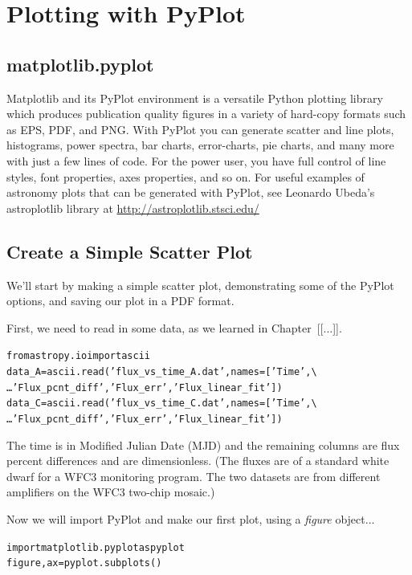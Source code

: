 \chapter{Plotting with PyPlot}
\label{ch:pyplot}

\section{matplotlib.pyplot}
Matplotlib and its PyPlot environment is a versatile Python plotting
library which produces publication quality figures in a variety of
hard-copy formats such as EPS, PDF, and PNG.  With PyPlot you can
generate scatter and line plots, histograms, power spectra, bar
charts, error-charts, pie charts, and many more with just a few lines
of code. For the power user, you have full control of line styles,
font properties, axes properties, and so on. For useful examples of 
astronomy plots that can be generated with PyPlot, see Leonardo 
Ubeda's astroplotlib library at \href{http://astroplotlib.stsci.edu/}
{http://astroplotlib.stsci.edu/}


\section{Create a Simple Scatter Plot}

We'll start by making a simple scatter plot, demonstrating some of 
the PyPlot options, and saving our plot in a PDF format. 

First, we need to read in some data, as we learned in Chapter~[[...]].

\begin{alltt}
\pytab from astropy.io import ascii
\pytab data_A = ascii.read('flux_vs_time_A.dat', names=['Time',  \textbackslash 
\ldots 'Flux_pcnt_diff', 'Flux_err', 'Flux_linear_fit'])
\pytab data_C = ascii.read('flux_vs_time_C.dat', names=['Time',  \textbackslash 
\ldots 'Flux_pcnt_diff', 'Flux_err', 'Flux_linear_fit'])
\end{alltt}

The time is in Modified Julian Date (MJD) and the remaining 
columns are flux percent differences and are dimensionless. 
(The fluxes are of a standard white dwarf for a WFC3 monitoring 
program. The two datasets are from different amplifiers
on the WFC3 two-chip mosaic.)

Now we will import PyPlot and make our first plot, 
using a \textit{figure} object...

\begin{alltt}
\pytab import matplotlib.pyplot as pyplot
\pytab figure, ax = pyplot.subplots()
\end{alltt}

